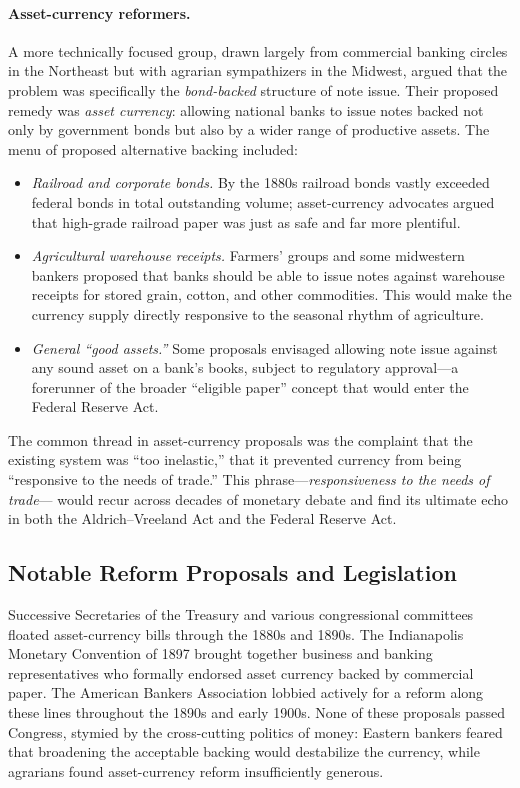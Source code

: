 \documentclass[12pt]{article}
\begin{document}
\paragraph{Asset-currency reformers.}  A more technically focused group, drawn
largely from commercial banking circles in the Northeast but with agrarian
sympathizers in the Midwest, argued that the problem was specifically the
\emph{bond-backed} structure of note issue.  Their proposed remedy was
\emph{asset currency}: allowing national banks to issue notes backed not only by
government bonds but also by a wider range of productive assets.  The menu of
proposed alternative backing included:
\begin{itemize}
  \item \emph{Railroad and corporate bonds.}  By the 1880s railroad bonds vastly
    exceeded federal bonds in total outstanding volume; asset-currency advocates
    argued that high-grade railroad paper was just as safe and far more plentiful.
  \item \emph{Agricultural warehouse receipts.}  Farmers' groups and some midwestern
    bankers proposed that banks should be able to issue notes against warehouse
    receipts for stored grain, cotton, and other commodities.  This would make
    the currency supply directly responsive to the seasonal rhythm of agriculture.
  \item \emph{General ``good assets.''} Some proposals envisaged allowing note
    issue against any sound asset on a bank's books, subject to regulatory
    approval---a forerunner of the broader ``eligible paper'' concept that would
    enter the Federal Reserve Act.
\end{itemize}

The common thread in asset-currency proposals was the complaint that the existing
system was ``too inelastic,'' that it prevented currency from being ``responsive to
the needs of trade.''  This phrase---\emph{responsiveness to the needs of trade}---
would recur across decades of monetary debate and find its ultimate echo in both
the Aldrich--Vreeland Act and the Federal Reserve Act.

\subsection{Notable Reform Proposals and Legislation}

Successive Secretaries of the Treasury and various congressional committees floated
asset-currency bills through the 1880s and 1890s.  The Indianapolis Monetary
Convention of 1897 brought together business and banking representatives who formally
endorsed asset currency backed by commercial paper.  The American Bankers
Association lobbied actively for a reform along these lines throughout the 1890s
and early 1900s.  None of these proposals passed Congress, stymied by the
cross-cutting politics of money: Eastern bankers feared that broadening the
acceptable backing would destabilize the currency, while agrarians found
asset-currency reform insufficiently generous.
\end{document}
